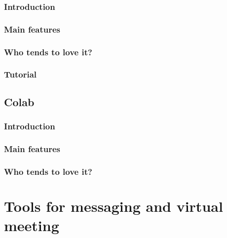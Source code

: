 \documentclass[
]{book}
\begin{document}
\hypertarget{introduction-3}{%
\subsection{Introduction}\label{introduction-3}}

\hypertarget{main-features-2}{%
\subsection{Main features}\label{main-features-2}}

\hypertarget{who-tends-to-love-it-2}{%
\subsection{Who tends to love it?}\label{who-tends-to-love-it-2}}

\hypertarget{tutorial-1}{%
\subsection{Tutorial}\label{tutorial-1}}

\hypertarget{colab}{%
\section{Colab}\label{colab}}

\hypertarget{introduction-4}{%
\subsection{Introduction}\label{introduction-4}}

\hypertarget{main-features-3}{%
\subsection{Main features}\label{main-features-3}}

\hypertarget{who-tends-to-love-it-3}{%
\subsection{Who tends to love it?}\label{who-tends-to-love-it-3}}

\hypertarget{tools-for-messaging-and-virtual-meeting}{%
\chapter{Tools for messaging and virtual meeting}\label{tools-for-messaging-and-virtual-meeting}}
\end{document}
